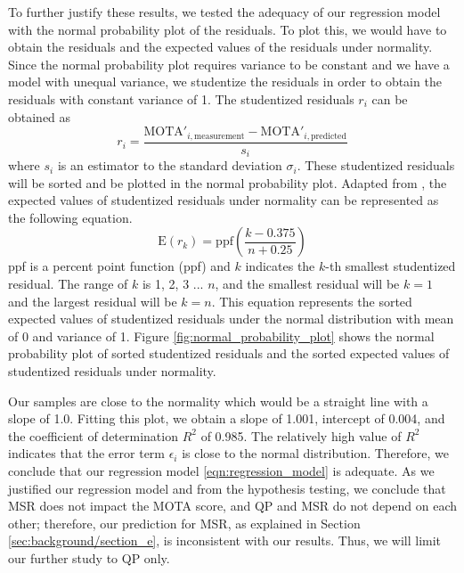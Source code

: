 To further justify these results, we tested the adequacy of our regression model with the normal probability plot of the residuals. To plot this, we would have to obtain the residuals and the expected values of the residuals under normality. Since the normal probability plot requires variance to be constant and we have a model with unequal variance, we studentize the residuals in order to obtain the residuals with constant variance of 1. The studentized residuals $r_i$ can be obtained as
\begin{equation}
    r_i = \frac{ \text{MOTA}'_{i,\text{measurement}} - \text{MOTA}'_{i,\text{predicted}} }{s_i}
    \label{eqn:residuals}
\end{equation}
where $s_i$ is an estimator to the standard deviation $\sigma_i$. These studentized residuals will be sorted and be plotted in the normal probability plot. Adapted from \cite[p.~111]{kutner_applied_2005}, the expected values of studentized residuals under normality can be represented as the following equation.
\begin{equation}
    \text{E}(r_k) = \text{ppf}( \frac{k - 0.375}{n + 0.25} )
\end{equation}
ppf is a percent point function (ppf) and $k$ indicates the $k$-th smallest studentized residual. The range of $k$ is 1, 2, 3 ... $n$, and the smallest residual will be $k = 1$ and the largest residual will be $k = n$. This equation represents the sorted expected values of studentized residuals under the normal distribution with mean of 0 and variance of 1. Figure \ref{fig:normal_probability_plot} shows the normal probability plot of sorted studentized residuals and the sorted expected values of studentized residuals under normality.

Our samples are close to the normality which would be a straight line with a slope of 1.0. Fitting this plot, we obtain a slope of 1.001, intercept of 0.004, and the coefficient of determination $R^2$ of 0.985. The relatively high value of $R^2$ indicates that the error term $\epsilon_i$ is close to the normal distribution. Therefore, we conclude that our regression model \eqref{eqn:regression_model} is adequate. As we justified our regression model and from the hypothesis testing, we conclude that MSR does not impact the MOTA score, and QP and MSR do not depend on each other; therefore, our prediction for MSR, as explained in Section \ref{sec:background/section_e}, is inconsistent with our results. Thus, we will limit our further study to QP only.

